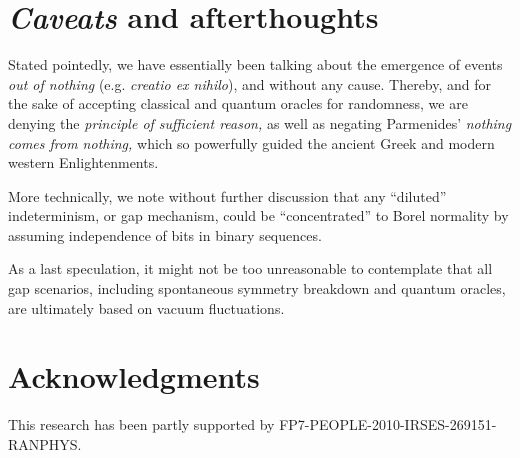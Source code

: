 \documentclass{llncs}
\begin{document}
\section{{\it Caveats} and afterthoughts}

Stated pointedly,
we have essentially been talking about the emergence of events {\em out of nothing} (e.g. {\it creatio ex nihilo}), and
without any cause.
Thereby, and for the sake of accepting classical and quantum oracles for randomness,
we are denying the  {\em principle of sufficient reason,}
as well as negating Parmenides' {\em nothing comes from nothing,}
which so powerfully guided the ancient Greek and modern western Enlightenments.

More technically,
we note without further discussion that any ``diluted'' indeterminism, or gap mechanism,
could be ``concentrated'' to Borel normality
by assuming independence of bits in binary sequences.

As a last  speculation,
it might not be too unreasonable to contemplate
that all gap scenarios,
including spontaneous symmetry breakdown and quantum oracles,
are ultimately based on vacuum fluctuations.



\section*{Acknowledgments}
This research has been partly supported by FP7-PEOPLE-2010-IRSES-269151-RANPHYS.

%
%
\end{document}
